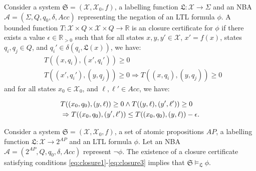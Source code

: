 \documentclass[acmlarge]{acmart}
\begin{document}
\begin{definition}
\label{LTLCC}
Consider a system $\mathfrak{S} = (\mathcal{X}, \mathcal{X}_0, f)$, a labelling function $\mathfrak{L} : \mathcal{X} \rightarrow \Sigma$ and an NBA $\mathcal{A} = (\Sigma, Q, q_0, \delta, Acc)$ representing the negation of an LTL formula $\phi$. A bounded function $T : \mathcal{X} \times Q \times \mathcal{X} \times Q \rightarrow \mathbb{R}$ is an closure certificate for $\phi$ if there exists a value $\epsilon \in \mathbb{R}_{> 0}$ such that for all states $x, y, y' \in \mathcal{X}$, $x' = f(x)$, states $q_i, q_j \in Q$, and $q_i' \in \delta(q_i, \mathfrak{L}(x))$, we have:
\begin{align}
    &T((x, q_i), (x', q_i')) \geq 0 \label{eq:closure1} \\
    &T((x', q_i'), (y, q_j)) \geq 0 \Rightarrow T((x, q_i), (y, q_j)) \geq 0 \label{eq:closure2}
\end{align}
and for all states $x_0 \in \mathcal{X}_0$, and $\ell, \ell' \in Acc$, we have:

\begin{align}
  & T((x_0, q_0), (y, \ell)) \geq 0 \land T((y, \ell), (y', \ell')) \geq 0 \notag \\
  &\Rightarrow T((x_0, q_0), (y', \ell')) \leq T((x_0, q_0), (y, \ell)) - \epsilon. \label{eq:closure3}
\end{align}
\end{definition}

\begin{theorem}[LTL]
Consider a system $\mathfrak{S}=(\mathcal{X}, \mathcal{X}_0, f)$, a set of atomic propositions $AP$, a labelling function $\mathfrak{L}: \mathcal{X} \rightarrow 2^{AP}$ and an LTL formula $\phi$. Let an NBA $\mathcal{A} = (2^{AP}, Q, q_0, \delta, Acc)$ represent $\neg \phi$. The existence of a closure certificate satisfying conditions \eqref{eq:closure1}-\eqref{eq:closure3} implies that $\mathfrak{S} \models_\mathfrak{L} \phi$.
\end{theorem}


\end{document}
